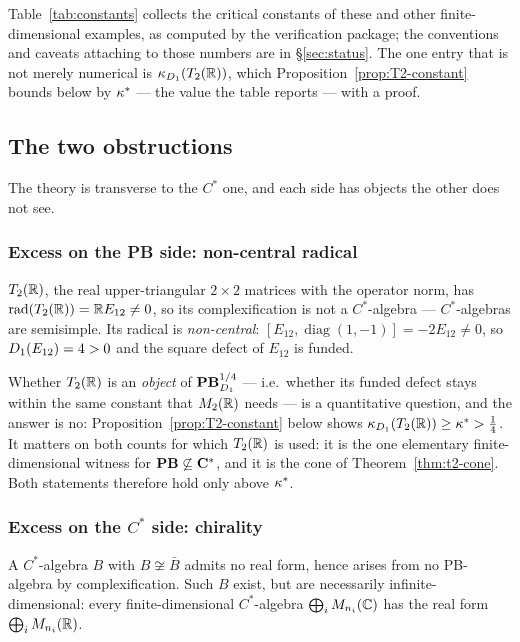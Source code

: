 Table~\ref{tab:constants} collects the critical constants of these and other
finite-dimensional examples, as computed by the verification package; the
conventions and caveats attaching to those numbers are in \S\ref{sec:status}.
The one entry that is not merely numerical is $\kappa_{D_1}(T_2(\mathbb{R}))$, which
Proposition~\ref{prop:T2-constant} bounds below by $\kappa^*$ --- the value the
table reports --- with a proof.



\subsection{The two obstructions}

The theory is transverse to the $C^*$ one, and each side has objects the other
does not see.

\subsubsection*{Excess on the PB side: non-central radical}

\begin{proposition}\label{prop:T2}
$T_2(\mathbb{R})$, the real upper-triangular $2\times2$ matrices with the operator
norm, has $\operatorname{rad}(T_2(\mathbb{R}))=\mathbb{R} E_{12}\ne0$, so its complexification is not a
$C^*$-algebra --- $C^*$-algebras are semisimple.  Its radical is
\emph{non-central}: $[E_{12},\operatorname{diag}(1,-1)]=-2E_{12}\ne0$, so
$D_1(E_{12})=4>0$ and the square defect of $E_{12}$ is funded.
\end{proposition}

Whether $T_2(\mathbb{R})$ is an \emph{object} of $\mathbf{PB}^{1/4}_{D_1}$ --- i.e.\
whether its funded defect stays within the same constant that $M_2(\mathbb{R})$ needs
--- is a quantitative question, and the answer is no:
Proposition~\ref{prop:T2-constant} below shows
$\kappa_{D_1}(T_2(\mathbb{R}))\ge\kappa^*>\tfrac14$.  It matters on both counts for
which $T_2(\mathbb{R})$ is used: it is the one elementary finite-dimensional witness
for $\mathbf{PB}\not\subseteq\mathbf{C}^{*}$, and it is the cone of
Theorem~\ref{thm:t2-cone}.  Both statements therefore hold only above
$\kappa^*$.

\subsubsection*{Excess on the $C^*$ side: chirality}

\begin{proposition}\label{prop:chirality}
A $C^*$-algebra $B$ with $B\not\cong\bar B$ admits no real form, hence arises
from no PB-algebra by complexification.  Such $B$ exist, but are necessarily
infinite-dimensional: every finite-dimensional $C^*$-algebra
$\bigoplus_iM_{n_i}(\mathbb{C})$ has the real form $\bigoplus_iM_{n_i}(\mathbb{R})$.
\end{proposition}

